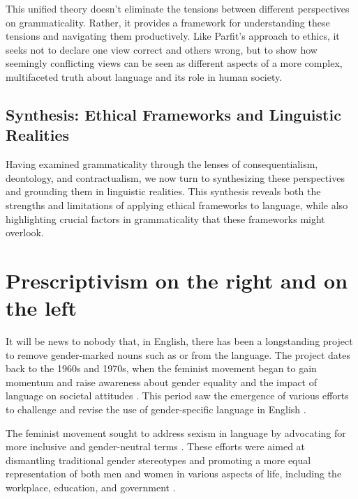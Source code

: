 This unified theory doesn't eliminate the tensions between different perspectives on grammaticality. Rather, it provides a framework for understanding these tensions and navigating them productively. Like Parfit's approach to ethics, it seeks not to declare one view correct and others wrong, but to show how seemingly conflicting views can be seen as different aspects of a more complex, multifaceted truth about language and its role in human society.

\subsection{Synthesis: Ethical Frameworks and Linguistic Realities}

Having examined grammaticality through the lenses of consequentialism, deontology, and contractualism, we now turn to synthesizing these perspectives and grounding them in linguistic realities. This synthesis reveals both the strengths and limitations of applying ethical frameworks to language, while also highlighting crucial factors in grammaticality that these frameworks might overlook.


\section{Prescriptivism on the right and on the left}

It will be news to nobody that, in English, there has been a longstanding project to remove gender-marked nouns such as  or  from the language. The project dates back to the 1960s and 1970s, when the feminist movement began to gain momentum and raise awareness about gender equality and the impact of language on societal attitudes \citep{cameron1998}. This period saw the emergence of various efforts to challenge and revise the use of gender-specific language in English \citep{lakoff1973}.

The feminist movement sought to address sexism in language by advocating for more inclusive and gender-neutral terms \citep{miller1976}. These efforts were aimed at dismantling traditional gender stereotypes and promoting a more equal representation of both men and women in various aspects of life, including the workplace, education, and government \citep{spender1980}.

